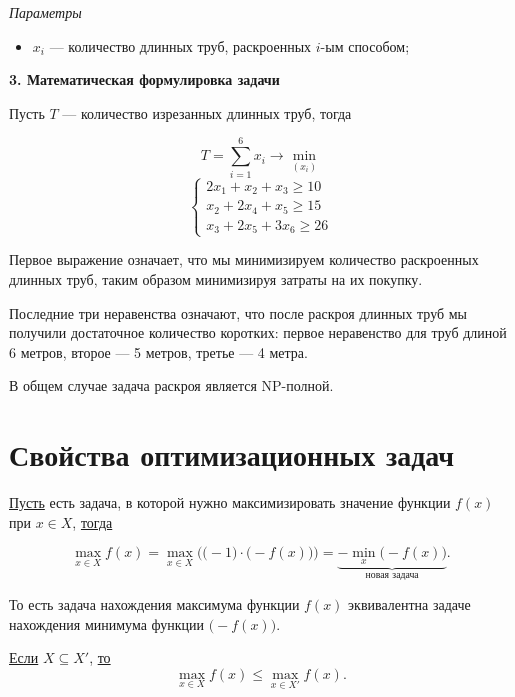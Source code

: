 \bigskip

\textit{Параметры}

\begin{itemize}[nosep]
	\item $x_i$ --- количество длинных труб, раскроенных $i$-ым способом;
\end{itemize}

\bigskip

\textbf{3. Математическая формулировка задачи}

Пусть $T$ --- количество изрезанных длинных труб, тогда

\[
T = \sum_{i=1}^6 x_i \to \min_{(x_i)}
\]
\[
\begin{cases}
	2x_1 + x_2 + x_3 \ge 10 \\
	x_2 + 2x_4 + x_5 \ge 15 \\
	x_3 + 2x_5 + 3x_6 \ge 26
\end{cases}
\]

Первое выражение означает, что мы минимизируем количество раскроенных длинных труб, таким образом минимизируя затраты на их покупку.

Последние три неравенства означают, что после раскроя длинных труб мы получили достаточное количество коротких: первое неравенство для труб длиной 6 метров, второе --- 5 метров, третье --- 4 метра.

\remark

В общем случае задача раскроя является NP-полной.

\section{Свойства оптимизационных задач}


\underline{Пусть} есть задача, в которой нужно максимизировать значение функции $f(x)$ при $x \in X$, \underline{тогда}

\[\max_{x \in X} f(x) = \max_{x \in X} \Big(\big(-1\big) \cdot \big(-f(x)\big)\Big) = \underbrace{-\min_x \big(-f(x)\big)}_{\text{новая задача}}.\]

То есть задача нахождения максимума функции $f(x)$ эквивалентна задаче нахождения минимума функции $\big(-f(x)\big)$.


\underline{Если} $X \subseteq X'$, \underline{то}
\[
\max_{x \in X} f(x) \le \max_{x \in X'} f(x).
\]



